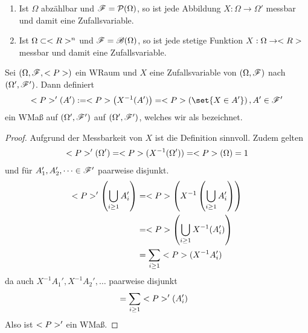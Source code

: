 \begin{example}
	\begin{enumerate}
		\item Ist $\Omega$ abzählbar und $\mathscr{F} = \mathcal{P}(\Omega)$, so ist jede Abbildung $X: \Omega \to \Omega'$ messbar und damit eine Zufallsvariable.
		\item Ist $\Omega \subset <R>^n$ und $\mathscr{F} = \mathscr{B}(\Omega)$, so ist jede stetige Funktion $X: \Omega \to <R>$ messbar und damit eine Zufallsvariable.
	\end{enumerate}
\end{example}

\begin{proposition}
	Sei $(\Omega, \mathscr{F}, <P>)$ ein WRaum und $X$ eine Zufallsvariable von $(\Omega, \mathscr{F})$ nach $(\Omega', \mathscr{F}')$. Dann definiert
	\begin{align}
		\probp'(A') := \probp\left(X^{-1}(A')\right) = \probp\left(\set{X \in A'}\right), A' \in \sigF'\notag
	\end{align}
	ein WMaß auf $(\Omega', \mathscr{F}')$ auf $(\Omega', \mathscr{F}')$, welches wir als  bezeichnet.
\end{proposition}

\begin{proof}
	Aufgrund der Messbarkeit von $X$ ist die Definition sinnvoll. Zudem gelten
	\begin{align}
		<P>'(\Omega') = <P>(X^{-1}(\Omega')) = <P>(\Omega) = 1\notag
	\end{align}
	und für $A_1', A_2', \dots \in \mathscr{F}'$ paarweise disjunkt.
	\begin{align}
		<P>'\left( \bigcup_{i \ge 1} A_i'\right) &= <P>\left(X^{-1}\left( \bigcup_{i \ge 1} A_i' \right)\right) \notag \\
		&= <P>\left( \bigcup_{i \ge 1} X^{-1}(A_i') \right) \notag \\
		&= \sum_{i \ge 1} <P>(X^{-1}A_i') \notag
	\end{align}
	da auch $X^{-1}A_1', X^{-1}A_2', \dots$ paarweise disjunkt
	\begin{align}
		&= \sum_{i \ge 1} <P>'(A_i')\notag
	\end{align}
	Also ist $<P>'$ ein WMaß. %
\end{proof}


